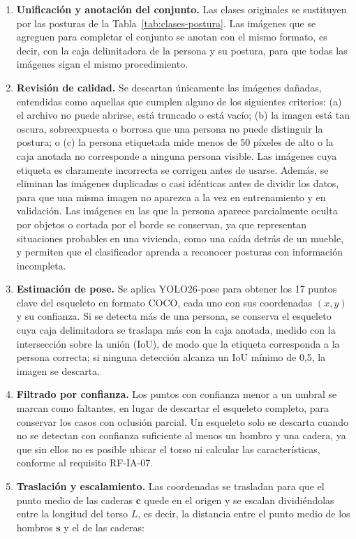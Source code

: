 \documentclass[12pt,a4paper,oneside]{book}
\theoremstyle{plain}
\theoremstyle{definition}
\theoremstyle{remark}
\begin{document}
\begin{enumerate}
  \item \textbf{Unificación y anotación del conjunto.} Las clases originales se sustituyen por las posturas de la Tabla~\ref{tab:clases-postura}. Las imágenes que se agreguen para completar el conjunto se anotan con el mismo formato, es decir, con la caja delimitadora de la persona y su postura, para que todas las imágenes sigan el mismo procedimiento.  \item \textbf{Revisión de calidad.} Se descartan únicamente las imágenes dañadas, entendidas como aquellas que cumplen alguno de los siguientes criterios: (a) el archivo no puede abrirse, está truncado o está vacío; (b) la imagen está tan oscura, sobreexpuesta o borrosa que una persona no puede distinguir la postura; o (c) la persona etiquetada mide menos de 50 píxeles de alto o la caja anotada no corresponde a ninguna persona visible. Las imágenes cuya etiqueta es claramente incorrecta se corrigen antes de usarse. Además, se eliminan las imágenes duplicadas o casi idénticas antes de dividir los datos, para que una misma imagen no aparezca a la vez en entrenamiento y en validación. Las imágenes en las que la persona aparece parcialmente oculta por objetos o cortada por el borde se conservan, ya que representan situaciones probables en una vivienda, como una caída detrás de un mueble, y permiten que el clasificador aprenda a reconocer posturas con información incompleta.
  \item \textbf{Estimación de pose.} Se aplica YOLO26-pose \parencite{ultralytics2026yolo26} para obtener los 17 puntos clave del esqueleto en formato COCO, cada uno con sus coordenadas $(x, y)$ y su confianza. Si se detecta más de una persona, se conserva el esqueleto cuya caja delimitadora se traslapa más con la caja anotada, medido con la intersección sobre la unión (IoU), de modo que la etiqueta corresponda a la persona correcta; si ninguna detección alcanza un IoU mínimo de 0,5, la imagen se descarta.
  \item \textbf{Filtrado por confianza.} Los puntos con confianza menor a un umbral se marcan como faltantes, en lugar de descartar el esqueleto completo, para conservar los casos con oclusión parcial. Un esqueleto solo se descarta cuando no se detectan con confianza suficiente al menos un hombro y una cadera, ya que sin ellos no es posible ubicar el torso ni calcular las características, conforme al requisito RF-IA-07.
  \item \textbf{Traslación y escalamiento.} Las coordenadas se trasladan para que el punto medio de las caderas $\mathbf{c}$ quede en el origen y se escalan dividiéndolas entre la longitud del torso $L$, es decir, la distancia entre el punto medio de los hombros $\mathbf{s}$ y el de las caderas:

\end{enumerate}
\end{document}
